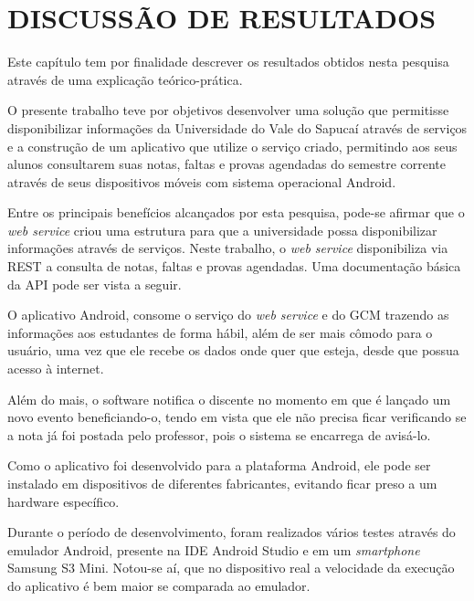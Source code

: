 
\chapter{DISCUSSÃO DE RESULTADOS} 

	\par Este capítulo tem por finalidade descrever os resultados obtidos nesta
pesquisa através de uma explicação teórico-prática.

	\par O presente trabalho teve por objetivos desenvolver uma solução que
permitisse disponibilizar informações da Universidade do Vale do Sapucaí
através de serviços e a construção de um aplicativo que utilize o serviço
criado, permitindo aos seus alunos consultarem suas notas, faltas e provas
agendadas do semestre corrente através de seus dispositivos móveis com sistema
operacional Android.

	\par Entre os principais benefícios alcançados por esta pesquisa, pode-se
afirmar que o \textit{web service} criou uma estrutura para que a universidade
possa disponibilizar informações através de serviços. Neste trabalho, o
\textit{web service} disponibiliza via REST a consulta de notas, faltas e
provas agendadas. Uma documentação básica da API pode ser vista a seguir.

	
	
	\par O aplicativo Android, consome o serviço do \textit{web service} e do GCM
trazendo as informações aos estudantes de forma hábil, além de ser mais cômodo
para o usuário, uma vez que ele recebe os dados onde quer que esteja, desde que
possua acesso à internet.

	\par Além do mais, o software notifica o discente no momento em que é lançado
um novo evento beneficiando-o, tendo em vista que ele não precisa ficar
verificando se a nota já foi postada pelo professor, pois o sistema se
encarrega de avisá-lo.

	\par Como o aplicativo foi desenvolvido para a plataforma Android, ele pode ser
instalado em dispositivos de diferentes fabricantes, evitando ficar preso a um
hardware específico.

	\par Durante o período de desenvolvimento, foram realizados vários testes
através do emulador Android, presente na IDE Android Studio e em um
\textit{smartphone} Samsung S{3} Mini. Notou-se aí, que no dispositivo real a
velocidade da execução do aplicativo é bem maior se comparada ao emulador.

